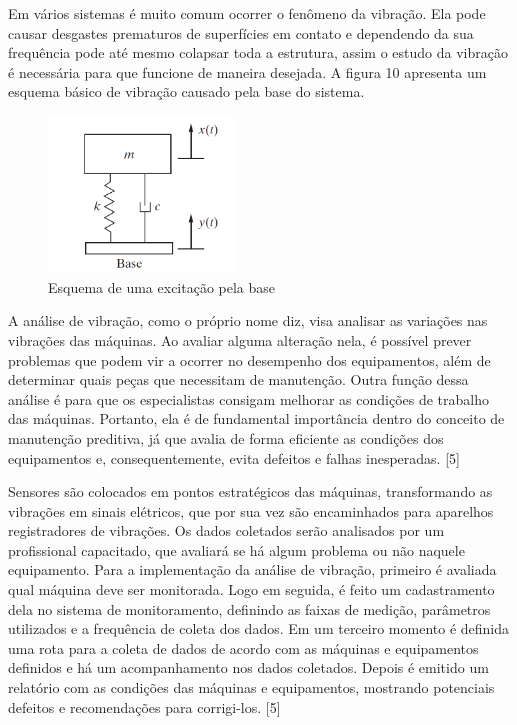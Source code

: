 Em vários sistemas é muito comum ocorrer o fenômeno da vibração. Ela pode causar desgastes prematuros de superfícies em contato e dependendo da sua frequência pode até mesmo colapsar toda a estrutura, assim o estudo da vibração é necessária para que funcione de maneira desejada. A figura 10 apresenta um esquema básico de vibração causado pela base do sistema.

\begin{figure}[H]
	\centering
	\includegraphics[width=5cm]{figuras/esquema_excitacao.png}
	\caption{Esquema de uma excitação pela base} \label{esquema_excitacao}
\end{figure}

A análise de vibração, como o próprio nome diz, visa analisar as variações nas vibrações das máquinas. Ao avaliar alguma alteração nela, é possível prever problemas que podem vir a ocorrer no desempenho dos equipamentos, além de determinar quais peças que necessitam de manutenção. Outra função dessa análise é para que os especialistas consigam melhorar as condições de trabalho das máquinas. Portanto, ela é de fundamental importância dentro do conceito de manutenção preditiva, já que avalia de forma eficiente as condições dos equipamentos e, consequentemente, evita defeitos e falhas inesperadas. [5]

Sensores são colocados em pontos estratégicos das máquinas, transformando as vibrações em sinais elétricos, que por sua vez são encaminhados para aparelhos registradores de vibrações. Os dados coletados serão analisados por um profissional capacitado, que avaliará se há algum problema ou não naquele equipamento. Para a implementação da análise de vibração, primeiro é avaliada qual máquina deve ser monitorada. Logo em seguida, é feito um cadastramento dela no sistema de monitoramento, definindo as faixas de medição, parâmetros utilizados e a frequência de coleta dos dados. Em um terceiro momento é definida uma rota para a coleta de dados de acordo com as máquinas e equipamentos definidos e há um acompanhamento nos dados coletados. Depois é emitido um relatório com as condições das máquinas e equipamentos, mostrando potenciais defeitos e recomendações para corrigi-los. [5]

